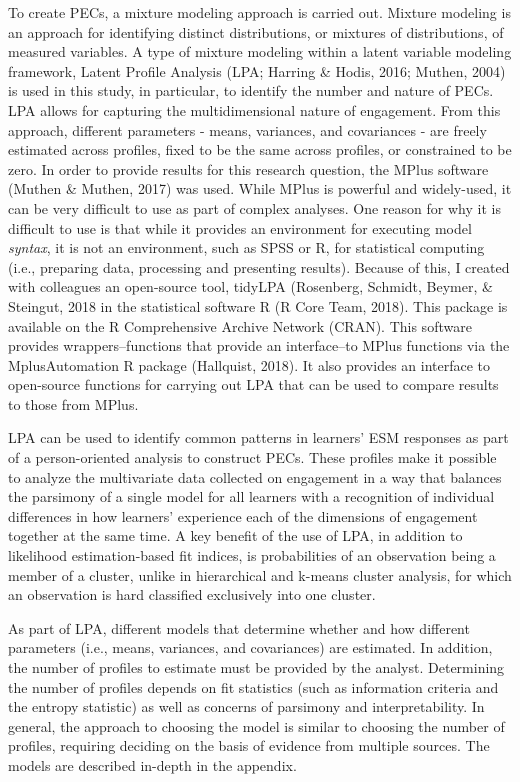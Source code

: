 \documentclass[]{msu-thesis}
\theoremstyle{definition}
\theoremstyle{definition}
\theoremstyle{definition}
\theoremstyle{remark}
\begin{document}
To create PECs, a mixture modeling approach is carried out. Mixture
modeling is an approach for identifying distinct distributions, or
mixtures of distributions, of measured variables. A type of mixture
modeling within a latent variable modeling framework, Latent Profile
Analysis (LPA; Harring \& Hodis, 2016; Muthen, 2004) is used in this
study, in particular, to identify the number and nature of PECs. LPA
allows for capturing the multidimensional nature of engagement. From
this approach, different parameters - means, variances, and covariances
- are freely estimated across profiles, fixed to be the same across
profiles, or constrained to be zero. In order to provide results for
this research question, the MPlus software (Muthen \& Muthen, 2017) was
used. While MPlus is powerful and widely-used, it can be very difficult
to use as part of complex analyses. One reason for why it is difficult
to use is that while it provides an environment for executing model
\emph{syntax}, it is not an environment, such as SPSS or R, for
statistical computing (i.e., preparing data, processing and presenting
results). Because of this, I created with colleagues an open-source
tool, tidyLPA (Rosenberg, Schmidt, Beymer, \& Steingut, 2018 in the
statistical software R (R Core Team, 2018). This package is available on
the R Comprehensive Archive Network (CRAN). This software provides
wrappers--functions that provide an interface--to MPlus functions via
the MplusAutomation R package (Hallquist, 2018). It also provides an
interface to open-source functions for carrying out LPA that can be used
to compare results to those from MPlus.

LPA can be used to identify common patterns in learners' ESM responses
as part of a person-oriented analysis to construct PECs. These profiles
make it possible to analyze the multivariate data collected on
engagement in a way that balances the parsimony of a single model for
all learners with a recognition of individual differences in how
learners' experience each of the dimensions of engagement together at
the same time. A key benefit of the use of LPA, in addition to
likelihood estimation-based fit indices, is probabilities of an
observation being a member of a cluster, unlike in hierarchical and
k-means cluster analysis, for which an observation is hard classified
exclusively into one cluster.

As part of LPA, different models that determine whether and how
different parameters (i.e., means, variances, and covariances) are
estimated. In addition, the number of profiles to estimate must be
provided by the analyst. Determining the number of profiles depends on
fit statistics (such as information criteria and the entropy statistic)
as well as concerns of parsimony and interpretability. In general, the
approach to choosing the model is similar to choosing the number of
profiles, requiring deciding on the basis of evidence from multiple
sources. The models are described in-depth in the appendix.
\end{document}
